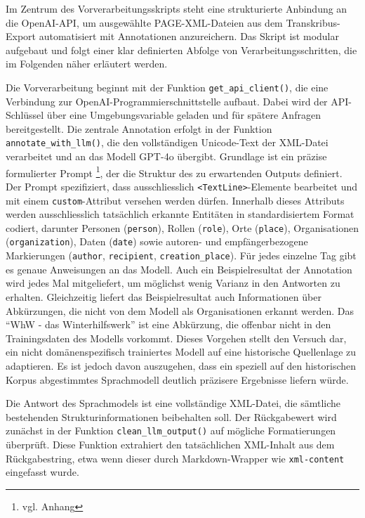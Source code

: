 \documentclass[12pt, a4paper, ngerman, bidi=default]{article}
\newcommand{\code}[1]{\colorbox{VeryLightGray}{\texttt{#1}}} %
\begin{document}
Im Zentrum des Vorverarbeitungsskripts steht eine strukturierte Anbindung an die OpenAI-API, um ausgewählte 
PAGE-XML-Dateien aus dem Transkribus-Export automatisiert mit Annotationen anzureichern. Das Skript ist modular
aufgebaut und folgt einer klar definierten Abfolge von Verarbeitungsschritten, die im Folgenden näher erläutert werden.

Die Vorverarbeitung beginnt mit der Funktion \code{get\_api\_client()}, die eine Verbindung zur OpenAI-Programmierschnittstelle 
aufbaut. Dabei wird der API-Schlüssel über eine Umgebungsvariable geladen und für spätere Anfragen bereitgestellt.
Die zentrale Annotation erfolgt in der Funktion \code{annotate\_with\_llm()}, die den vollständigen Unicode-Text der XML-Datei
verarbeitet und an das Modell GPT-4o übergibt. Grundlage ist ein präzise formulierter Prompt \footnote{vgl. Anhang }, der die Struktur des zu erwartenden
Outputs definiert. Der Prompt spezifiziert, dass ausschliesslich \code{<TextLine>}-Elemente bearbeitet und mit einem \code{custom}-Attribut
versehen werden dürfen. Innerhalb dieses Attributs werden ausschliesslich tatsächlich erkannte Entitäten in standardisiertem Format codiert, 
darunter Personen (\code{person}), Rollen (\code{role}), Orte (\code{place}), Organisationen (\code{organization}), Daten (\code{date}) 
sowie autoren- und empfängerbezogene Markierungen (\code{author}, \code{recipient}, \code{creation\_place}). Für jedes einzelne Tag gibt es genaue Anweisungen
an das Modell. Auch ein Beispielresultat der Annotation wird jedes Mal mitgeliefert, um möglichst wenig Varianz in den Antworten zu erhalten. Gleichzeitig liefert
das Beispielresultat auch Informationen über Abkürzungen, die nicht von dem Modell als Organisationen erkannt werden. Das \enquote{WhW - das Winterhilfswerk} ist eine
Abkürzung, die offenbar nicht in den Trainingsdaten des Modells vorkommt. Dieses Vorgehen stellt den Versuch dar, ein nicht domänenspezifisch trainiertes Modell 
auf eine historische Quellenlage zu adaptieren. Es ist jedoch davon auszugehen, dass ein speziell auf den historischen Korpus abgestimmtes Sprachmodell 
deutlich präzisere Ergebnisse liefern würde.

Die Antwort des Sprachmodels ist eine vollständige XML-Datei, die sämtliche bestehenden Strukturinformationen beibehalten soll. 
Der Rückgabewert wird zunächst in der Funktion \code{clean\_llm\_output()} auf mögliche Formatierungen überprüft. Diese Funktion 
extrahiert den tatsächlichen XML-Inhalt aus dem Rückgabestring, etwa wenn dieser durch Markdown-Wrapper 
wie \code{\textasciigrave\textasciigrave\textasciigrave xml-content\textquotesingle\textquotesingle\textquotesingle} eingefasst wurde.
\end{document}
